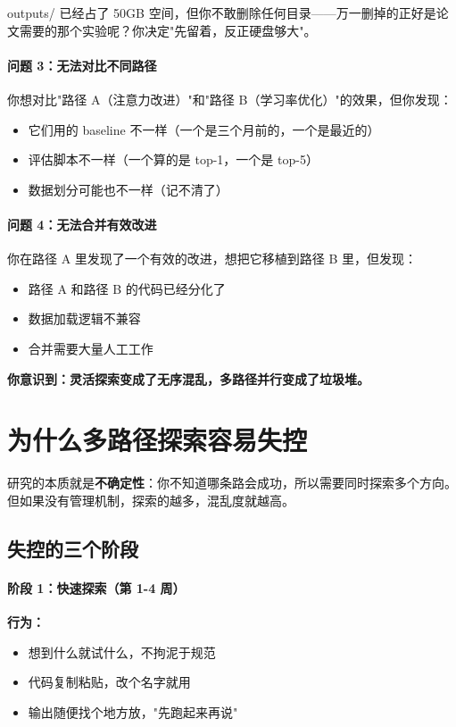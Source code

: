 outputs/ 已经占了 50GB 空间，但你不敢删除任何目录——万一删掉的正好是论文需要的那个实验呢？你决定"先留着，反正硬盘够大"。

\paragraph{问题 3：无法对比不同路径}

你想对比"路径 A（注意力改进）"和"路径 B（学习率优化）"的效果，但你发现：
\begin{itemize}
  \item 它们用的 baseline 不一样（一个是三个月前的，一个是最近的）
  \item 评估脚本不一样（一个算的是 top-1，一个是 top-5）
  \item 数据划分可能也不一样（记不清了）
\end{itemize}

\paragraph{问题 4：无法合并有效改进}

你在路径 A 里发现了一个有效的改进，想把它移植到路径 B 里，但发现：
\begin{itemize}
  \item 路径 A 和路径 B 的代码已经分化了
  \item 数据加载逻辑不兼容
  \item 合并需要大量人工工作
\end{itemize}

\textbf{你意识到：灵活探索变成了无序混乱，多路径并行变成了垃圾堆。}

\section{为什么多路径探索容易失控}

研究的本质就是\textbf{不确定性}：你不知道哪条路会成功，所以需要同时探索多个方向。但如果没有管理机制，探索的越多，混乱度就越高。

\subsection{失控的三个阶段}

\paragraph{阶段 1：快速探索（第 1-4 周）}

\textbf{行为：}
\begin{itemize}
  \item 想到什么就试什么，不拘泥于规范
  \item 代码复制粘贴，改个名字就用
  \item 输出随便找个地方放，"先跑起来再说"
\end{itemize}

